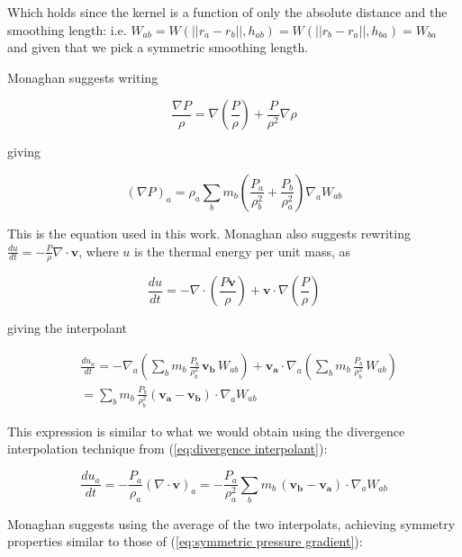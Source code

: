 \documentclass[../main.tex]{subfiles}
\begin{document}
Which holds since the kernel is a function of only the absolute distance and the smoothing length:
i.e. $W_{ab} = W(||r_a - r_b||, h_{ab}) = W(||r_b - r_a||, h_{ba}) = W_{ba}$ and given that we pick
a symmetric smoothing length.

Monaghan \autocite{monaghan1992} suggests writing

\begin{equation}
    \frac{\nabla P}{\rho} = \nabla (\frac{P}{\rho}) + \frac{P}{\rho^2} \nabla \rho
\end{equation}

giving

\begin{equation} \label{eq:symmetric pressure gradient}
    (\nabla P)_a = \rho_a \sum_b m_b (\frac{P_a}{\rho_b^2} + \frac{P_b}{\rho_a^2}) \nabla_a W_{ab}
\end{equation}

This is the equation used in this work. Monaghan also suggests rewriting $\frac{du}{dt} = -
\frac{P}{\rho} \nabla \cdot \bm{v}$, where $u$ is the thermal energy per unit mass, as

\begin{equation} \label{eq:2.19}
    \frac{du}{dt}
    = - \nabla \cdot (\frac{P\bm{v}}{\rho}) + \bm{v} \cdot \nabla (\frac{P}{\rho})
\end{equation}

giving the interpolant

\begin{equation}
\begin{aligned}
  & \frac{du_a}{dt}
  = - \nabla_a (\sum_b m_b \, \frac{P_b}{\rho_b^2} \, \bm{v_b} \, W_{ab})
  + \bm{v_a} \cdot \nabla_a (\sum_b m_b \, \frac{P_b}{\rho_b^2} \, W_{ab}) \\
  & = \sum_b m_b \, \frac{P_b}{\rho_b^2} (\bm{v_a} - \bm{v_b}) \cdot \nabla_a W_{ab}
\end{aligned}
\end{equation}

This expression is similar to what we would obtain using the divergence interpolation technique from
(\ref{eq:divergence interpolant}):

\begin{equation}
    \frac{du_a}{dt}
    = - \frac{P_a}{\rho_a} (\nabla \cdot \bm{v})_a
    = - \frac{P_a}{\rho_a^2} \sum_b m_b \, (\bm{v_b} - \bm{v_a}) \cdot \nabla_a W_{ab}
\end{equation}

Monaghan suggests using the average of the two interpolats, achieving symmetry properties similar to
those of (\ref{eq:symmetric pressure gradient}):
\end{document}
